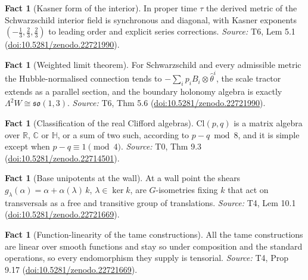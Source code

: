 \documentclass[11pt]{article}
\theoremstyle{definition}
\newtheorem{fact}[theorem]{Fact}
\theoremstyle{plain}
\providecommand{\C}{}\renewcommand{\C}{\mathbb{C}}
\providecommand{\Cl}{}\renewcommand{\Cl}{\mathrm{Cl}}
\providecommand{\HH}{}\renewcommand{\HH}{\mathbb{H}}
\providecommand{\R}{}\renewcommand{\R}{\mathbb{R}}
\begin{document}
\begin{fact}[Kasner form of the interior]\label{c:interior.kasner-form-interior}
In proper time $\tau$ the derived metric of the Schwarzschild interior field is synchronous and diagonal, with Kasner exponents $(-\tfrac13, \tfrac23, \tfrac23)$ to leading order and explicit series corrections.
\emph{Source:} T6, Lem 5.1 (\href{https://doi.org/10.5281/zenodo.22721990}{doi:10.5281/zenodo.22721990}).
\end{fact}

\begin{fact}[Weighted limit theorem]\label{c:interior.weighted-limit-theorem}
For Schwarzschild and every admissible metric the Hubble-normalised connection tends to $-\sum_i p_i B_i \otimes \hat\theta^i$, the scale tractor extends as a parallel section, and the boundary holonomy algebra is exactly $\Lambda^2 W \cong \mathfrak{so}(1,3)$.
\emph{Source:} T6, Thm 5.6 (\href{https://doi.org/10.5281/zenodo.22721990}{doi:10.5281/zenodo.22721990}).
\end{fact}

\begin{fact}[Classification of the real Clifford algebras]\label{c:primer.classification-real-clifford-algebras}
$\Cl(p,q)$ is a matrix algebra over $\R$, $\C$ or $\HH$, or a sum of two such, according to $p - q \bmod 8$, and it is simple except when $p - q \equiv 1 \pmod 4$.
\emph{Source:} T0, Thm 9.3 (\href{https://doi.org/10.5281/zenodo.22714501}{doi:10.5281/zenodo.22714501}).
\end{fact}

\begin{fact}[Base unipotents at the wall]\label{c:sheaf.base-unipotents-wall}
At a wall point the shears $g_\lambda(\alpha) = \alpha + \alpha(\lambda)\,k$, $\lambda \in \ker k$, are $G$-isometries fixing $k$ that act on transversals as a free and transitive group of translations.
\emph{Source:} T4, Lem 10.1 (\href{https://doi.org/10.5281/zenodo.22721669}{doi:10.5281/zenodo.22721669}).
\end{fact}

\begin{fact}[Function-linearity of the tame constructions]\label{c:sheaf.function-linearity-tame-constructions}
All the tame constructions are linear over smooth functions and stay so under composition and the standard operations, so every endomorphism they supply is tensorial.
\emph{Source:} T4, Prop 9.17 (\href{https://doi.org/10.5281/zenodo.22721669}{doi:10.5281/zenodo.22721669}).
\end{fact}
\end{document}
